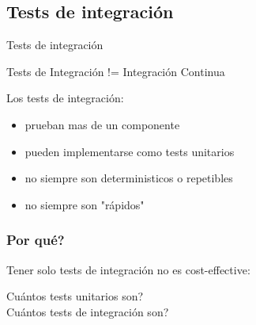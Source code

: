 \subsection{Tests de integraci\'on}
\begin{frame}[t]{Tests de integraci\'on}
\begin{center}
	\alert{ Tests de Integraci\'on != Integraci\'on Continua }
\end{center}
Los tests de integraci\'on:
\begin{itemize}
	\item prueban mas de un componente
	\item pueden implementarse como tests unitarios
	\item no siempre son deterministicos o repetibles
	\item no siempre son "r\'apidos"
\end{itemize}
\end{frame}

\begin{frame}[fragile]
\frametitle{\textquestiondown Por qu\'e?}
Tener solo tests de integraci\'on no es cost-effective:

\begin{center} \alert{
	\textquestiondown Cu\'antos tests unitarios son? \\
	\textquestiondown Cu\'antos tests de integraci\'on son?
} \end{center}
\end{frame}

